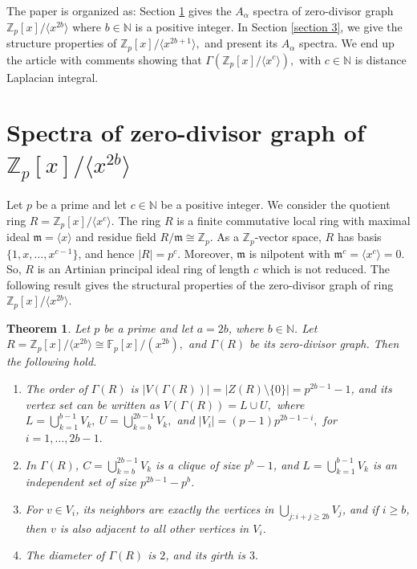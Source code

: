 \documentclass[12pt,twoside]{article}
\newtheorem{theorem}{Theorem}[section]
\begin{document}
	The paper is organized as: Section \ref{section 2} gives the $A_{\alpha}$ spectra of zero-divisor graph $\mathbb{Z}_p[x]/\langle x^{2b}\rangle $ where $b\in \mathbb{N}$ is a positive integer. In Section \ref{section 3}, we give the structure properties of $\mathbb{Z}_p[x]/\langle x^{2b+1}\rangle,$ and  present its $A_{\alpha}$ spectra. We end up the article with comments showing that $ \varGamma(\mathbb{Z}_p[x]/\langle x^{c}\rangle), $ with $c\in \mathbb{N}$ is distance Laplacian integral.
	
	
	\section{Spectra of zero-divisor graph of $\mathbb{Z}_p[x]/\langle x^{2b}\rangle $}\label{section 2}
	Let $p$ be a prime and let $c\in \mathbb{N}$ be a positive integer. We consider the quotient ring $R = \mathbb{Z}_p[x]/\langle x^{c}\rangle.$	The ring $R$ is a finite commutative local ring with maximal ideal $\mathfrak{m}=\langle x\rangle$ and residue field $R/\mathfrak{m}\cong \mathbb{Z}_p$. As a $\mathbb{Z}_p$-vector space, $R$ has basis $\{1,x,\dots,x^{c-1}\}$, and hence $|R| = p^{c}$. Moreover, $\mathfrak{m}$ is nilpotent with $\mathfrak{m}^{c}=\langle x^{c}\rangle=0$. So, $R$ is an Artinian principal ideal ring of length $c$ which is not reduced. The following result gives the structural properties of the zero-divisor graph of ring  $\mathbb{Z}_p[x]/\langle x^{2b}\rangle$.
	\begin{theorem}\label{even case}
		Let $p$ be a prime and let $a=2b$, where $b\in \mathbb{N}$. Let $R = \mathbb{Z}_p[x]/\langle x^{2b}\rangle\cong\mathbb{F}_p[x]/(x^{2b}),$ and  $ \varGamma(R)$ be its zero-divisor graph. Then the following hold.
		\begin{enumerate} 
			\item The order of $ \varGamma(R)$ is $|V( \varGamma(R))|= |Z(R)\setminus\{0\}|= p^{ 2b-1} - 1$, and its vertex set can be written as $V( \varGamma(R))=L\cup U,$ where $L=\bigcup_{k=1}^{b-1} V_k, ~U = \bigcup_{k=b}^{2b-1} V_k,$ and $|V_i|= (p-1)p^{ 2b-1-i},  $ for $ i=1,\dots,2b-1.$
			\item In $ \varGamma(R)$, $C=\bigcup_{k=b}^{2b-1} V_k$ is a clique of size $p^{b} - 1$, and $L=\bigcup_{k=1}^{b-1}V_k$ is an independent set of size $p^{2b-1}-p^{b}$.
			\item For $v\in V_i$, its neighbors are exactly the vertices in $\bigcup_{j: i+j\ge 2b} V_j$, and if $i\ge b$, then $v$ is also adjacent to all other vertices in $V_i$.
			\item The diameter of $ \varGamma(R)$ is $2$, and its girth is $3.$
		\end{enumerate}
	\end{theorem}
\end{document}
